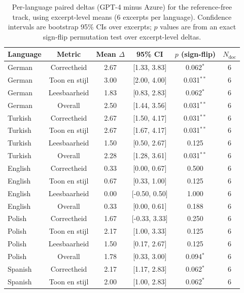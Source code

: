 \begin{table}[htbp]
\centering
\scriptsize
\renewcommand{\arraystretch}{1.15}
\setlength{\tabcolsep}{6pt}
\caption{Per-language paired deltas (GPT-4 minus Azure) for the reference-free track, using excerpt-level means (6 excerpts per language). Confidence intervals are bootstrap 95\% CIs over excerpts; $p$ values are from an exact sign-flip permutation test over excerpt-level deltas.}
\label{tab:ref-free-deltas-by-language}
\begin{tabular}{@{}l c c c c c@{}}
\toprule
Language & Metric & Mean $\Delta$ & 95\% CI & $p$ (sign-flip) & $N_{\text{doc}}$ \\
\midrule
German & Correctheid & 2.67 & [1.33, 3.83] & 0.062$^{*}$ & 6 \\
German & Toon en stijl & 3.00 & [2.00, 4.00] & 0.031$^{**}$ & 6 \\
German & Leesbaarheid & 1.83 & [0.83, 2.83] & 0.062$^{*}$ & 6 \\
German & Overall & 2.50 & [1.44, 3.56] & 0.031$^{**}$ & 6 \\
\addlinespace[2pt]
Turkish & Correctheid & 2.67 & [1.50, 4.17] & 0.031$^{**}$ & 6 \\
Turkish & Toon en stijl & 2.67 & [1.67, 4.17] & 0.031$^{**}$ & 6 \\
Turkish & Leesbaarheid & 1.50 & [0.50, 2.67] & 0.125 & 6 \\
Turkish & Overall & 2.28 & [1.28, 3.61] & 0.031$^{**}$ & 6 \\
\addlinespace[2pt]
English & Correctheid & 0.33 & [0.00, 0.67] & 0.500 & 6 \\
English & Toon en stijl & 0.67 & [0.33, 1.00] & 0.125 & 6 \\
English & Leesbaarheid & 0.00 & [-0.50, 0.50] & 1.000 & 6 \\
English & Overall & 0.33 & [0.00, 0.61] & 0.188 & 6 \\
\addlinespace[2pt]
Polish & Correctheid & 1.67 & [-0.33, 3.33] & 0.250 & 6 \\
Polish & Toon en stijl & 2.17 & [1.00, 3.33] & 0.125 & 6 \\
Polish & Leesbaarheid & 1.50 & [0.17, 2.67] & 0.125 & 6 \\
Polish & Overall & 1.78 & [0.33, 3.00] & 0.094$^{*}$ & 6 \\
\addlinespace[2pt]
Spanish & Correctheid & 2.17 & [1.17, 2.83] & 0.062$^{*}$ & 6 \\
Spanish & Toon en stijl & 2.00 & [1.00, 2.83] & 0.062$^{*}$ & 6 \\

\end{tabular}
\end{table}
